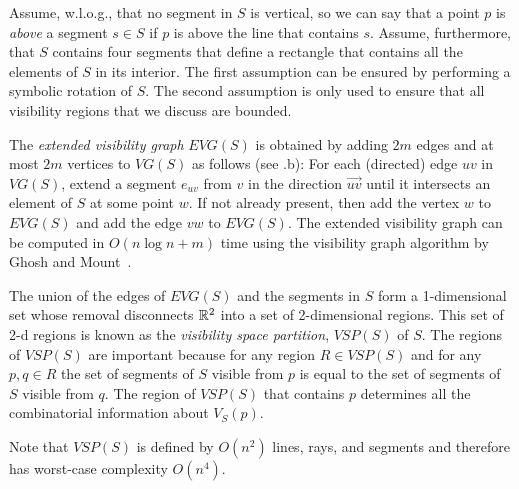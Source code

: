 \documentclass{patmorin}
\newcommand{\VG}{\mathit{VG}}
\newcommand{\EVG}{\mathit{EVG}}
\newcommand{\VSP}{\mathit{VSP}}
\begin{document}
Assume, w.l.o.g., that no segment in $S$ is vertical, so
we can say that a point $p$ is \emph{above} a segment $s\in S$ if $p$ is
above the line that contains $s$.  Assume, furthermore, that $S$ contains
four segments that define a rectangle that contains all the elements of $S$
in its interior.
The first assumption can be ensured by performing a
symbolic rotation of $S$.  The second assumption is only used to ensure
that all visibility regions that we discuss are bounded.

The \emph{extended visibility graph} $\EVG(S)$ is obtained by adding
$2m$ edges and at most $2m$ vertices to $\VG(S)$ as follows (see .b):
For each (directed) edge $uv$ in $\VG(S)$, extend a
segment $e_{uv}$ from $v$ in the direction $\overrightarrow{uv}$ until it
intersects an element of $S$ at some point $w$.  If not already present,
then add the vertex $w$ to $\EVG(S)$ and add the edge $vw$ to $\EVG(S)$.
The extended visibility graph can be computed in $O(n\log n + m)$ time
using the visibility graph algorithm by Ghosh and Mount~\cite{gm91}.

The union of the edges of $\EVG(S)$ and the segments in $S$ form a
1-dimensional set whose removal disconnects $\mathbb{R}^2$ into a set of
2-dimensional regions.  This set of 2-d regions is known as the
\emph{visibility space partition}, $\VSP(S)$ of $S$.  The regions
of $\VSP(S)$ are important because for any region $R\in\VSP(S)$
and for any $p,q\in R$ the set of segments of $S$ visible from $p$ is equal to
the set of segments of $S$ visible from $q$.  The region of $\VSP(S)$ that
contains $p$ determines all the combinatorial information about $V_S(p)$.

Note that $\VSP(S)$ is defined by $O(n^2)$ lines, rays, and segments
and therefore has worst-case complexity $O(n^4)$.
\end{document}
